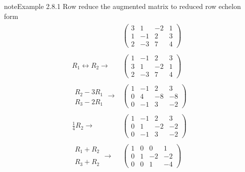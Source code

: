 \documentclass[letterpaper,10pt,english]{jupyterBook}
\begin{document}
\begin{sphinxadmonition}{note}{Example 2.8.1}
\sphinxAtStartPar
Row reduce the augmented matrix to reduced row echelon form
\begin{equation*}
\begin{split} \begin{align*}
    & \left( \begin{array}{ccc|c}
        3 & 1 & -2 & 1 \\
        1 & -1 & 2 & 3 \\
        2 & -3 & 7 & 4
    \end{array} \right)
    \\ \\
     R_1 \leftrightarrow R_2 \longrightarrow
    & \left( \begin{array}{ccc|c}
        1 & -1 & 2 & 3 \\
        3 & 1 & -2 & 1 \\
        2 & -3 & 7 & 4
    \end{array} \right)
    \\ \\
    \begin{array}{l} \\ R_2 - 3R_1 \\ R_3 - 2R_1 \end{array}  \longrightarrow
    & \left( \begin{array}{ccc|c}
        1 & -1 & 2 & 3 \\
        0 & 4 & -8 & -8 \\
        0 & -1 & 3 & -2
    \end{array} \right)
    \\ \\
    \frac{1}{4} R_2 \longrightarrow
    & \left( \begin{array}{ccc|c}
        1 & -1 & 2 & 3 \\
        0 & 1 & -2 & -2 \\
        0 & -1 & 3 & -2
    \end{array} \right)
 	\\ \\
    \begin{array}{l} R_1 + R_2 \\ \\ R_3 + R_2 \end{array} \longrightarrow
    & \left( \begin{array}{ccc|c}
        1 & 0 & 0 & 1 \\
        0 & 1 & -2 & -2 \\
        0 & 0 & 1 & -4
    \end{array} \right)

\end{align*}
\end{split}
\end{equation*}
\end{sphinxadmonition}
\end{document}

